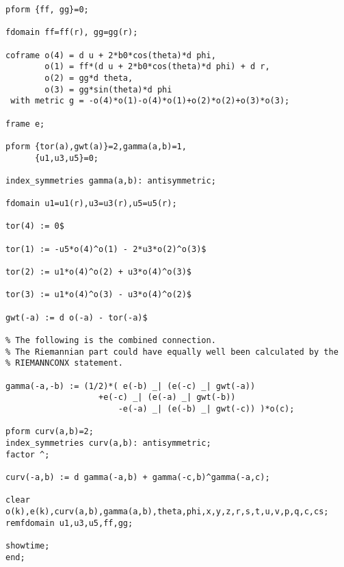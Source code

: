 {\begin{verbatim}
pform {ff, gg}=0;

fdomain ff=ff(r), gg=gg(r);

coframe o(4) = d u + 2*b0*cos(theta)*d phi,
        o(1) = ff*(d u + 2*b0*cos(theta)*d phi) + d r,
        o(2) = gg*d theta,
        o(3) = gg*sin(theta)*d phi
 with metric g = -o(4)*o(1)-o(4)*o(1)+o(2)*o(2)+o(3)*o(3);

frame e;

pform {tor(a),gwt(a)}=2,gamma(a,b)=1,
      {u1,u3,u5}=0;

index_symmetries gamma(a,b): antisymmetric;

fdomain u1=u1(r),u3=u3(r),u5=u5(r);

tor(4) := 0$

tor(1) := -u5*o(4)^o(1) - 2*u3*o(2)^o(3)$

tor(2) := u1*o(4)^o(2) + u3*o(4)^o(3)$

tor(3) := u1*o(4)^o(3) - u3*o(4)^o(2)$

gwt(-a) := d o(-a) - tor(-a)$

% The following is the combined connection.
% The Riemannian part could have equally well been calculated by the
% RIEMANNCONX statement.

gamma(-a,-b) := (1/2)*( e(-b) _| (e(-c) _| gwt(-a))
	               +e(-c) _| (e(-a) _| gwt(-b))
                       -e(-a) _| (e(-b) _| gwt(-c)) )*o(c);

pform curv(a,b)=2;
index_symmetries curv(a,b): antisymmetric;
factor ^;

curv(-a,b) := d gamma(-a,b) + gamma(-c,b)^gamma(-a,c);

clear o(k),e(k),curv(a,b),gamma(a,b),theta,phi,x,y,z,r,s,t,u,v,p,q,c,cs;
remfdomain u1,u3,u5,ff,gg;

showtime;
end;
\end{verbatim}
}
